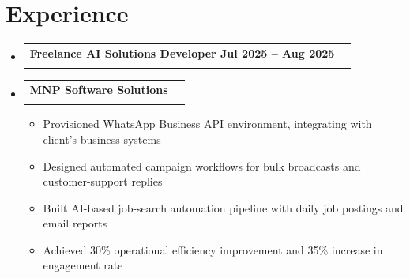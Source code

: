 \documentclass[letterpaper,11pt]{article}
\makeatletter
\newcommand{\resumeItem}[1]{
  \item\small{#1 \vspace{-2pt}}
}
\newcommand{\resumeSubheading}[4]{
  \vspace{-2pt}\item
  \begin{tabular*}{0.97\textwidth}[t]{l@{\extracolsep{\fill}}r}
    \textbf{#1} & #2 \\
    \textit{\small#3} & \textit{\small #4} \\
  \end{tabular*}\vspace{-7pt}
}
\newcommand{\resumeSubHeadingListStart}{\begin{itemize}[leftmargin=0.15in, label={}]}
\newcommand{\resumeSubHeadingListEnd}{\end{itemize}}
\newcommand{\resumeItemListStart}{\begin{itemize}}
\newcommand{\resumeItemListEnd}{\end{itemize}\vspace{-5pt}}
\makeatother
\begin{document}
\section{Experience}
\resumeSubHeadingListStart
  \resumeSubheading{Freelance AI Solutions Developer Jul 2025 – Aug 2025}{}{}{}
  \resumeSubheading{MNP Software Solutions}{}{}{}
  \resumeItemListStart
    \resumeItem{Provisioned WhatsApp Business API environment, integrating with client’s business systems}
    \resumeItem{Designed automated campaign workflows for bulk broadcasts and customer-support replies}
    \resumeItem{Built AI-based job-search automation pipeline with daily job postings and email reports}
    \resumeItem{Achieved 30\% operational efficiency improvement and 35\% increase in engagement rate}
  \resumeItemListEnd
\resumeSubHeadingListEnd
\end{document}
